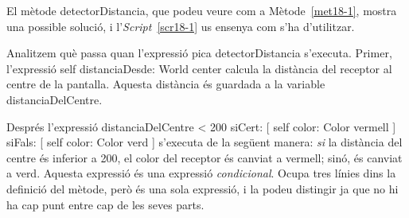 El mètode \textsf{detectorDistancia}, que podeu veure com a Mètode~\ref{met18-1}, mostra una possible solució, i l'\emph{Script}~\ref{scr18-1} us ensenya com s'ha d'utilitzar.
Analitzem què passa quan l'expressió \textsf{pica detectorDistancia} s'executa. Primer, l'expressió \textsf{self distanciaDesde: World center} calcula la distància del receptor al centre de la pantalla. Aquesta distància és guardada a la variable \textsf{distanciaDelCentre}. 

Després l'expressió \textsf{distanciaDelCentre \textless \hspace*{1mm}   200 siCert: [  self color: Color vermell  ] siFals: [  self color: Color verd  ]}
s'executa de la següent manera: \emph{si} la distància del centre és inferior a 200, el color del receptor és canviat a vermell; sinó, és canviat a verd. Aquesta expressió és una expressió \emph{condicional}. Ocupa tres línies dins la definició del mètode, però és una sola expressió, i la podeu distingir ja que no hi ha cap punt entre cap de les seves parts.

